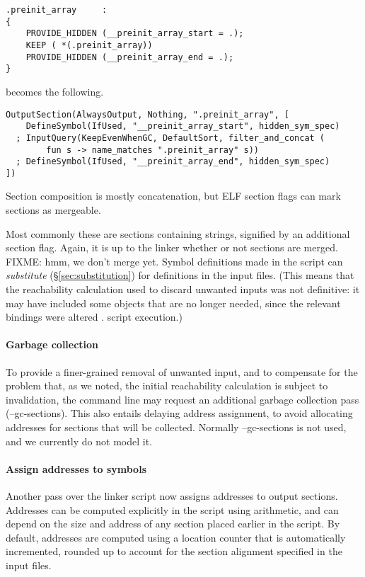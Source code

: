 \begin{lstlisting}[basicstyle=\scriptsize\sffamily,language=plain]
.preinit_array     :
{
    PROVIDE_HIDDEN (__preinit_array_start = .);
    KEEP ( *(.preinit_array))
    PROVIDE_HIDDEN (__preinit_array_end = .);
}
\end{lstlisting}
  
becomes the following.

\begin{lstlisting}[basicstyle=\scriptsize\sffamily,language=plain]
OutputSection(AlwaysOutput, Nothing, ".preinit_array", [
    DefineSymbol(IfUsed, "__preinit_array_start", hidden_sym_spec)
  ; InputQuery(KeepEvenWhenGC, DefaultSort, filter_and_concat (
        fun s -> name_matches ".preinit_array" s))
  ; DefineSymbol(IfUsed, "__preinit_array_end", hidden_sym_spec)
])
\end{lstlisting}

Section composition is mostly concatenation, but ELF section flags can mark sections as mergeable.

Most commonly these are sections containing strings, signified by an additional section flag.
Again, it is up to the linker whether or not sections are merged.
FIXME: hmm, we don't merge yet.
Symbol definitions made in the script can \emph{substitute} (\S\ref{sec:substitution}) for definitions 
in the input files. (This means that the reachability calculation
used to discard unwanted inputs was not definitive: it may have included
some objects that are no longer needed, since the relevant bindings were altered .
script execution.)

\paragraph{Garbage collection} To provide a finer-grained 
removal of unwanted input, and to compensate for the problem that, as we noted,
the initial reachability calculation is subject to invalidation, 
the command line may request an additional garbage collection pass (\textsf{--gc-sections}).
This also entails delaying address assignment, to avoid allocating addresses for sections
that will be collected.
Normally \textsf{--gc-sections} is not used, and we currently do not model it.

\paragraph{Assign addresses to symbols} Another pass over the linker script now
assigns addresses to output sections. 
Addresses can be computed explicitly in the script using arithmetic, and can depend on the size
and address of any section placed earlier in the script. 
By default, addresses are computed using a location counter
that is automatically incremented, rounded up to account for the section alignment specified in the input files.

